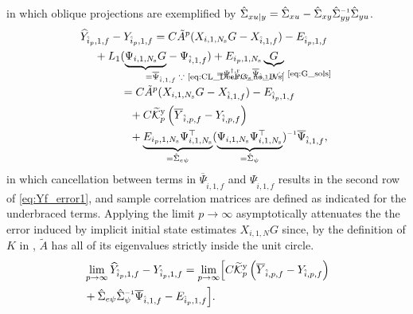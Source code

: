 in which oblique projections are exemplified by $\hat{\Sigma}_{xu|y}=\hat{\Sigma}_{xu}-\hat{\Sigma}_{xy}\hat{\Sigma}_{yy}\inv\hat{\Sigma}_{yu}$.
%
\begin{align}
    \begin{split}
        &\!\!\!\widehat{Y}_{\hat{i}_p,1,f}-Y_{\hat{i}_p,1,f} = C \tilde{A}^p (%
        X_{i,1,N_\mathrm{s}}G%
        -X_{\hat{i},1,f})-E_{\hat{i}_p,1,f}\\
        &\phantom{=}+ L_1(\smash{\underbrace{\Psi_{i,1,N_\mathrm{s}}G}_{\mathrlap{=\overline{\Psi}_{\hat{i},1,f}\;\because \text{ \eqref{eq:CL_DeePC_no_IVs}}}}}
        -\Psi_{\hat{i},1,f}) +%
        E_{i_p,1,N_\mathrm{s}}\underbrace{G}_{\mathclap{=\Psi_{i,1,N_\mathrm{s}}^{\dagger,\mathrm{r}}\overline{\Psi}_{\hat{i},1,f}\;\because\text{ \eqref{eq:G_sols}}}}%
    \end{split}\notag\\
    \begin{split}
        &=C \tilde{A}^p (X_{i,1,N_\mathrm{s}}G-X_{\hat{i},1,f}) - E_{\hat{i}_p,1,f}\\
        &\phantom{=}+C\tKp{y}\left(\overline{Y}_{\hat{i},p,f}-Y_{\hat{i},p,f}\right)\\
        &\phantom{=}+\underbrace{E_{i_p,1,N_\mathrm{s}}\Psi_{i,1,N_\mathrm{s}}^\top}_{=\hat{\Sigma}_{e\psi}}(\underbrace{\Psi_{i,1,N_\mathrm{s}}\Psi_{i,1,N_\mathrm{s}}^\top}_{=\hat{\Sigma}_{\psi}})\inv \overline{\Psi}_{\hat{i},1,f},
    \end{split}\label{eq:Yf_error1}
\end{align}
in which cancellation between terms in $\overline{\Psi}_{\hat{i},1,f}$ and $\Psi_{\hat{i},1,f}$ results in the second row of \eqref{eq:Yf_error1}, and sample correlation matrices are defined as indicated for the underbraced terms. Applying the limit $p\rightarrow\infty$ asymptotically attenuates the the error induced by implicit initial state estimates $X_{i,1,N}G$ since, by the definition of $K$ in , $\tilde{A}$ has all of its eigenvalues strictly inside the unit circle.
\begin{alignat}{2}
\begin{split}\label{eq:Yf_error2}
    \!\!&\lim_{p\rightarrow\infty}\widehat{Y}_{\hat{i}_p,1,f}-Y_{\hat{i}_p,1,f} = \lim_{p\rightarrow\infty}\!\Big[C\tKp{y}\left(\overline{Y}_{\hat{i},p,f}-Y_{\hat{i},p,f}\right)\\
        &%
        +\hat{\Sigma}_{e\psi}\hat{\Sigma}_{\psi}\inv \overline{\Psi}_{\hat{i},1,f}-E_{\hat{i}_p,1,f}\Big].
\end{split}
\end{alignat}%
